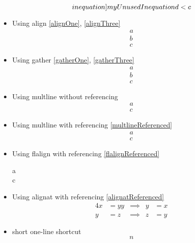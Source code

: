 \documentclass{article}
\def\ifautonum#1{#1}%
\def\ifautonum#1{}%
\begin{document}
\begin{itemize}
{				\begin{equation}\label[inequation]{myUnusedInequation}
					d < c
				\end{equation}
		}
		\item Using align \ref{alignOne}, \ref{alignThree}
			\begin{align}
				a\label{alignOne}\\
				b\label{alignTwo}\\
				c\label{alignThree}
			\end{align}
		\item Using gather \ref{gatherOne}, \ref{gatherThree}
			\begin{gather}
				a\label{gatherOne}\\
				b\label{gatherTwo}\\
				c\label{gatherThree}
			\end{gather}
		\item Using multline without referencing
			\begin{multline}
				a\\
				c\label{multlineUnreferenced}
			\end{multline}
		\item Using multline with referencing \ref{multlineReferenced}
			\begin{multline}
				a\\
				c\label{multlineReferenced}
			\end{multline}
		\item Using flalign with referencing \ref{flalignReferenced}
			\begin{flalign}
				a\\
				c\label{flalignReferenced}
			\end{flalign}
		\item Using alignat with referencing \ref{alignatReferenced}
			\begin{alignat}{4}
				x &= yy & \implies & y &= x \label{alignatUnreferenced}\\
				y &= z & \implies & z &= y \label{alignatReferenced}
			\end{alignat}
		\item short one-line shortcut \[n\]
		\ifautonum{
			\item align, numbering always \begin{align+} a=l \end{align+} (needs autonum)
}
\end{itemize}
\end{document}
